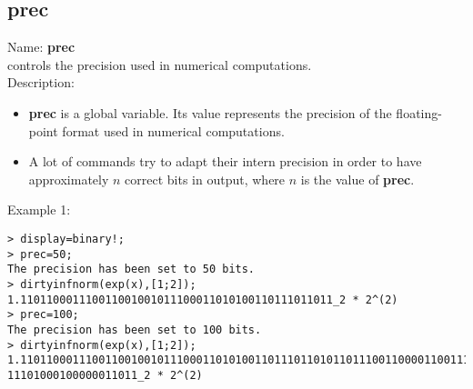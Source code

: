 \subsection{prec}
\label{labprec}
\noindent Name: \textbf{prec}\\
controls the precision used in numerical computations.\\

\noindent Description: \begin{itemize}

\item \textbf{prec} is a global variable. Its value represents the precision of the 
   floating-point format used in numerical computations.

\item A lot of commands try to adapt their intern precision in order to have 
   approximately $n$ correct bits in output, where $n$ is the value of \textbf{prec}.
\end{itemize}
\noindent Example 1: 
\begin{center}\begin{minipage}{15cm}\begin{Verbatim}[frame=single]
> display=binary!;
> prec=50;
The precision has been set to 50 bits.
> dirtyinfnorm(exp(x),[1;2]);
1.110110001110011001001011100011010100110111011011_2 * 2^(2)
> prec=100;
The precision has been set to 100 bits.
> dirtyinfnorm(exp(x),[1;2]);
1.110110001110011001001011100011010100110111011010110111001100001100111010001110
11101000100000011011_2 * 2^(2)
\end{Verbatim}
\end{minipage}\end{center}
